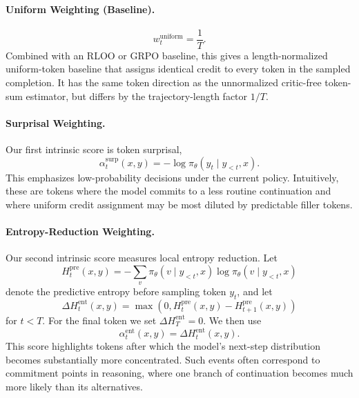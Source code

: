 \paragraph{Uniform Weighting (Baseline).}
\begin{equation}w_t^{\text{uniform}}=\frac{1}{T}.\end{equation}
Combined with an RLOO or GRPO baseline, this gives a length-normalized
uniform-token baseline that assigns identical credit to every token in the
sampled completion. It has the same token direction as the unnormalized
critic-free token-sum estimator, but differs by the trajectory-length factor
$1/T$.

\paragraph{Surprisal Weighting.}
Our first intrinsic score is token surprisal,
\begin{equation}
\alpha_t^{\text{surp}}(x,y)=-\log \pi_\theta(y_t \mid y_{<t},x).
\end{equation}
This emphasizes low-probability decisions under the current policy. Intuitively, these
are tokens where the model commits to a less routine continuation and where uniform
credit assignment may be most diluted by predictable filler tokens.

\paragraph{Entropy-Reduction Weighting.}
Our second intrinsic score measures local entropy reduction. Let
\begin{equation}
H_t^{\mathrm{pre}}(x,y)=-\sum_{v}\pi_\theta(v \mid y_{<t},x)\log \pi_\theta(v \mid y_{<t},x)
\end{equation}
denote the predictive entropy before sampling token $y_t$, and let
\begin{equation}
\Delta H_t^{\mathrm{ent}}(x,y)=\max\left(0, H_t^{\mathrm{pre}}(x,y)-H_{t+1}^{\mathrm{pre}}(x,y)\right)
\end{equation}
for $t<T$. For the final token we set $\Delta H_T^{\mathrm{ent}}=0$. We then use
\begin{equation}
\alpha_t^{\text{ent}}(x,y)=\Delta H_t^{\mathrm{ent}}(x,y).
\end{equation}
This score highlights tokens after which the model's next-step distribution becomes
substantially more concentrated. Such events often correspond to commitment points in
reasoning, where one branch of continuation becomes much more likely than its
alternatives.

